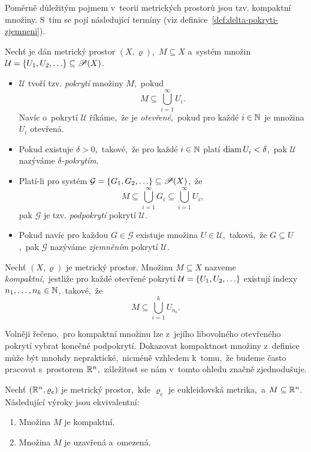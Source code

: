 Poměrně důležitým pojmem v~teorii metrických prostorů jsou tzv. kompaktní množiny. S~tím se pojí následující termíny (viz definice~\ref{def:delta-pokryti-zjemneni}).
\begin{definition}\label{def:delta-pokryti-zjemneni}
    Nechť je dán metrický prostor $(X,\varrho)$,~$M\subseteq X$ a~systém množin $\mathcal{U}=\left\{U_1,U_2,\ldots\right\}\subseteq\mathscr{P}(X)$.
    \begin{itemize}
        \item $\mathcal{U}$ tvoří tzv. \emph{pokrytí} množiny $M$,~pokud
        \[M\subseteq\bigcup_{i=1}^\infty U_i.\]
        Navíc o~pokrytí $\mathcal{U}$ říkáme,~že je \emph{otevřené},~pokud pro každé $i\in\mathbb{N}$ je množina $U_i$ otevřená.
        \item Pokud existuje $\delta>0$,~takové,~že pro každé $i\in\mathbb{N}$ platí $\operatorname{diam}{U_i}<\delta$,~pak $\mathcal{U}$ nazýváme \emph{$\delta$-pokrytím}.
        \item Platí-li pro systém $\mathcal{G}=\left\{G_1,G_2,\ldots\right\}\subseteq\mathscr{P}(X)$,~že
        \[M\subseteq\bigcup_{i=1}^\infty G_i\subseteq\bigcup_{i=1}^\infty U_i,\]
        pak $\mathcal{G}$ je tzv. \emph{podpokrytí} pokrytí $\mathcal{U}$.
        \item Pokud navíc pro každou $G\in\mathcal{G}$ existuje množina $U\in\mathcal{U}$,~taková,~že $G\subseteq U$,~pak $\mathcal{G}$ nazýváme \emph{zjemněním} pokrytí $\mathcal{U}$. 
    \end{itemize}
\end{definition}
\begin{definition}\label{def:kompaktni-mnozina}
    Nechť $(X,\varrho)$ je metrický prostor. Množinu $M\subseteq X$ nazveme \emph{kompaktní},~jestliže pro každé otevřené pokrytí $\mathcal{U}=\left\{U_1,U_2,\ldots\right\}$ existují indexy $n_1,\ldots,n_k\in\mathbb{N}$,~takové,~že
    \[M\subseteq\bigcup_{i=1}^k U_{n_i}.\]
\end{definition}
Volněji řečeno,~pro kompaktní množinu lze z~jejího libovolného otevřeného pokrytí vybrat konečné podpokrytí. Dokazovat kompaktnost množiny z~definice může být mnohdy nepraktické,~nicméně vzhledem k~tomu,~že budeme často pracovat s~prostorem $\mathbb{R}^n$,~záležitost se nám v~tomto ohledu značně zjednodušuje.
\begin{theorem}\label{thm:heine-borel}
    Nechť $(\mathbb{R}^n,\varrho_e)$ je metrický prostor,~kde $\varrho_e$ je eukleidovská metrika,~a $M\subseteq\mathbb{R}^n$. Následující výroky jsou ekvivalentní:
    \begin{enumerate}[label=(\roman*)]
        \item Množina $M$ je kompaktní.
        \item Množina $M$ je uzavřená a~omezená.
    \end{enumerate}
\end{theorem}
